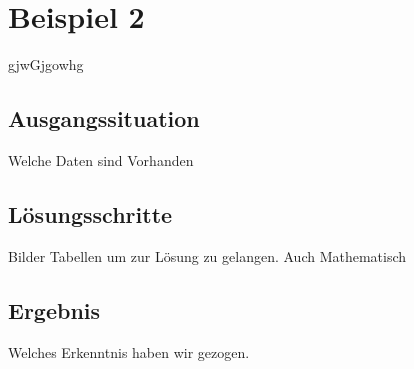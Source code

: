 \section{Beispiel 2}
\label{sec:beispiel2}
gjwGjgowhg

\subsection{Ausgangssituation} 
\label{sec:ausgangssituation2}
Welche Daten sind Vorhanden 


\subsection{Lösungsschritte} 
\label{sec:loesungen2}
Bilder Tabellen um zur Lösung zu gelangen. Auch Mathematisch

\subsection{Ergebnis} 
\label{sec:ergebnis2}
Welches Erkenntnis haben wir gezogen.
